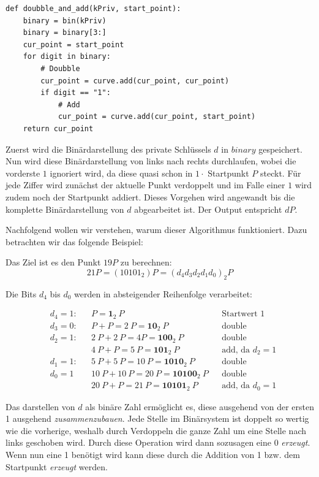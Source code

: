\vspace{\baselineskip}
\begin{lstlisting}[caption={Double-And-Add-Algorithmus in Python}, captionpos=b]
def doubble_and_add(kPriv, start_point):
	binary = bin(kPriv)
	binary = binary[3:]
    cur_point = start_point
    for digit in binary:
        # Doubble
	    cur_point = curve.add(cur_point, cur_point)
		if digit == "1":
	        # Add
            cur_point = curve.add(cur_point, start_point)
    return cur_point
\end{lstlisting}
\vspace{\baselineskip}

Zuerst wird die Binärdarstellung des private Schlüssels $d$ in $binary$ gespeichert. Nun wird diese Binärdarstellung von links nach rechts durchlaufen, wobei die vorderste $1$ ignoriert wird, da diese quasi schon in $1 \cdot$ Startpunkt $P$ steckt. Für jede Ziffer wird zunächst der aktuelle Punkt verdoppelt und im Falle einer $1$ wird zudem noch der Startpunkt addiert. Dieses Vorgehen wird angewandt bis die komplette Binärdarstellung von $d$ abgearbeitet ist. Der Output entspricht $dP$.

Nachfolgend wollen wir verstehen, warum dieser Algorithmus funktioniert. Dazu betrachten wir das folgende Beispiel:

Das Ziel ist es den Punkt $19	 P$ zu berechnen:
$$21P = (10101_2)P = (d_4 d_3 d_2 d_1 d_0)_2 P$$

Die Bits $d_4$ bis $d_0$ werden in absteigender Reihenfolge verarbeitet:

\begin{align*}
&d_4 = 1:	&&P = \boldsymbol{1}_2\ P  							&&\text{Startwert 1}\\
&d_3 = 0: 	&&P + P = 2\ P = \boldsymbol{10}_2\ P 				&&\text{double}\\
&d_2 = 1: 	&&2\ P + 2\ P = 4 P = \boldsymbol{100}_2\ P 			&&\text{double}\\
&			&&4\ P + P = 5\ P = \boldsymbol{101}_2\ P 			&&\text{add, da $d_2 = 1$}\\
&d_1 = 1: 	&&5\ P + 5\ P = 10\ P = \boldsymbol{1010}_2\ P 		&&\text{double}\\
&d_0 = 1  	&&10\ P + 10\ P = 20\ P = \boldsymbol{10100}_2\ P 	&&\text{double}\\
&			&&20\ P + P = 21\ P = \boldsymbol{10101}_2\ P 		&&\text{add, da $d_0 = 1$}
\end{align*}

Das darstellen von $d$ als binäre Zahl ermöglicht es, diese ausgehend von der ersten 1 ausgehend \textit{zusammenzubauen}. Jede Stelle im Binärsystem ist doppelt so wertig wie die vorherige, weshalb durch Verdoppeln die ganze Zahl um eine Stelle nach links geschoben wird. Durch diese Operation wird dann sozusagen eine 0 \textit{erzeugt}. Wenn nun eine 1 benötigt wird kann diese durch die Addition von 1 bzw. dem Startpunkt \textit{erzeugt} werden.\\

